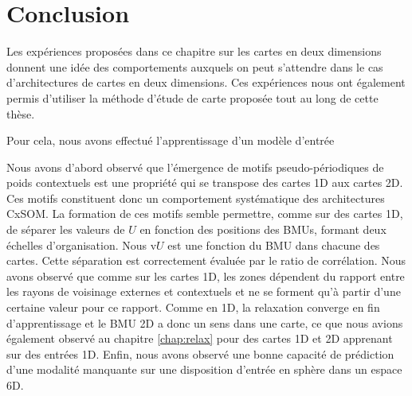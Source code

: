 \documentclass[../main]{subfiles}
\begin{document}
\section{Conclusion}

Les expériences proposées dans ce chapitre sur les cartes en deux dimensions donnent une idée des comportements auxquels on peut s'attendre dans le cas d'architectures de cartes en deux dimensions.
Ces expériences nous ont également permis d'utiliser la méthode d'étude de carte proposée tout au long de cette thèse.

Pour cela, nous avons effectué l'apprentissage d'un modèle d'entrée


Nous avons d'abord observé que l'émergence de motifs pseudo-périodiques de poids contextuels est une propriété qui se transpose des cartes 1D aux cartes 2D. Ces motifs constituent donc un comportement systématique des architectures CxSOM. La formation de ces motifs semble permettre, comme sur des cartes 1D, de séparer les valeurs de $U$ en fonction des positions des BMUs, formant deux échelles d'organisation. 
Nous v$U$ est une fonction du BMU dans chacune des cartes.
Cette séparation est correctement évaluée par le ratio de corrélation.
Nous avons observé que comme sur les cartes 1D, les zones dépendent du rapport entre les rayons de voisinage externes et contextuels et ne se forment qu'à partir d'une certaine valeur pour ce rapport.
Comme en 1D, la relaxation converge en fin d'apprentissage et le BMU 2D a donc un sens dans une carte, ce que nous avions également observé au chapitre \ref{chap:relax} pour des cartes 1D et 2D apprenant sur des entrées 1D.
Enfin, nous avons observé une bonne capacité de prédiction d'une modalité manquante sur une disposition d'entrée en sphère dans un espace 6D.
\end{document}
